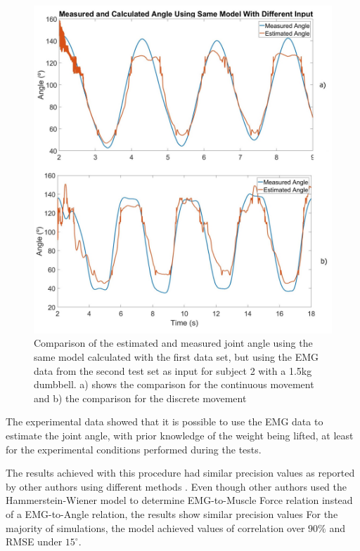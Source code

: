 \documentclass[letterpaper, 10 pt, conference]{ieeeconf}  %
\begin{document}
\begin{figure}[bthp]
      \centering
      \includegraphics[width=0.95\columnwidth]{Images/Different_Input.jpg}
      \caption{Comparison of the estimated and measured joint angle using the same model calculated with the first data set, but using the EMG data from the second test set as input for subject 2 with a 1.5kg dumbbell. a) shows the comparison for the continuous movement and b) the comparison for the discrete movement}
      \label{Validation Procedure}
   \end{figure}

The experimental data showed that it is possible to use the EMG data to estimate the joint angle, with prior knowledge of the weight being lifted, at least for the experimental conditions performed during the tests.

The results achieved with this procedure had similar precision values as reported by other authors using different methods \cite{Rahmatian2016158,Mamikoglu2016785,Pang2015165,Liu1999391}. Even though other authors used the Hammerstein-Wiener model to determine EMG-to-Muscle Force relation instead of a EMG-to-Angle relation, the results show similar precision values \cite{Abbasi-Asl2011,sab2010,clancy2012}
For the majority of simulations, the model achieved values of correlation over $90\%$ and RMSE under $15^\circ$.
\end{document}
